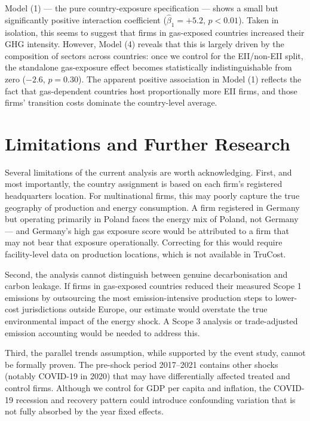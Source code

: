 \documentclass[12pt,a4paper]{article}
\begin{document}
Model (1) — the pure country-exposure specification — shows a small but significantly positive interaction coefficient ($\hat\beta_1 = +5.2$, $p<0.01$). Taken in isolation, this seems to suggest that firms in gas-exposed countries increased their GHG intensity. However, Model (4) reveals that this is largely driven by the composition of sectors across countries: once we control for the EII/non-EII split, the standalone gas-exposure effect becomes statistically indistinguishable from zero ($-2.6$, $p=0.30$). The apparent positive association in Model (1) reflects the fact that gas-dependent countries host proportionally more EII firms, and those firms' transition costs dominate the country-level average.

\section{Limitations and Further Research}
\label{sec:limits}

Several limitations of the current analysis are worth acknowledging. First, and most importantly, the country assignment is based on each firm's registered headquarters location. For multinational firms, this may poorly capture the true geography of production and energy consumption. A firm registered in Germany but operating primarily in Poland faces the energy mix of Poland, not Germany — and Germany's high gas exposure score would be attributed to a firm that may not bear that exposure operationally. Correcting for this would require facility-level data on production locations, which is not available in TruCost.

Second, the analysis cannot distinguish between genuine decarbonisation and carbon leakage. If firms in gas-exposed countries reduced their measured Scope 1 emissions by outsourcing the most emission-intensive production steps to lower-cost jurisdictions outside Europe, our estimate would overstate the true environmental impact of the energy shock. A Scope 3 analysis or trade-adjusted emission accounting would be needed to address this.

Third, the parallel trends assumption, while supported by the event study, cannot be formally proven. The pre-shock period 2017–2021 contains other shocks (notably COVID-19 in 2020) that may have differentially affected treated and control firms. Although we control for GDP per capita and inflation, the COVID-19 recession and recovery pattern could introduce confounding variation that is not fully absorbed by the year fixed effects.
\end{document}
